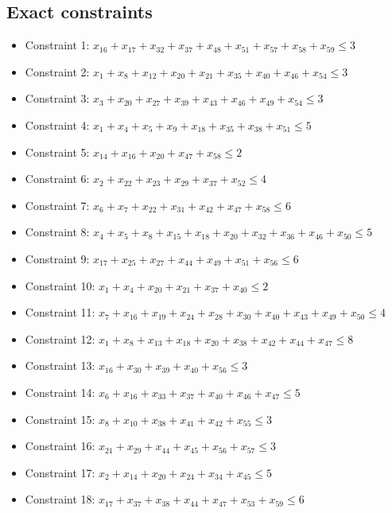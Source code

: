 \documentclass[11pt]{article}
\begin{document}
\subsection*{Exact constraints}
\begin{itemize}
\item Constraint 1: $x_{16} + x_{17} + x_{32} + x_{37} + x_{48} + x_{51} + x_{57} + x_{58} + x_{59} \le 3$
\item Constraint 2: $x_{1} + x_{8} + x_{12} + x_{20} + x_{21} + x_{35} + x_{40} + x_{46} + x_{54} \le 3$
\item Constraint 3: $x_{3} + x_{20} + x_{27} + x_{39} + x_{43} + x_{46} + x_{49} + x_{54} \le 3$
\item Constraint 4: $x_{1} + x_{4} + x_{5} + x_{9} + x_{18} + x_{35} + x_{38} + x_{51} \le 5$
\item Constraint 5: $x_{14} + x_{16} + x_{20} + x_{47} + x_{58} \le 2$
\item Constraint 6: $x_{2} + x_{22} + x_{23} + x_{29} + x_{37} + x_{52} \le 4$
\item Constraint 7: $x_{6} + x_{7} + x_{22} + x_{31} + x_{42} + x_{47} + x_{58} \le 6$
\item Constraint 8: $x_{4} + x_{5} + x_{8} + x_{15} + x_{18} + x_{20} + x_{32} + x_{36} + x_{46} + x_{50} \le 5$
\item Constraint 9: $x_{17} + x_{25} + x_{27} + x_{44} + x_{49} + x_{51} + x_{56} \le 6$
\item Constraint 10: $x_{1} + x_{4} + x_{20} + x_{21} + x_{37} + x_{40} \le 2$
\item Constraint 11: $x_{7} + x_{16} + x_{19} + x_{24} + x_{28} + x_{30} + x_{40} + x_{43} + x_{49} + x_{50} \le 4$
\item Constraint 12: $x_{1} + x_{8} + x_{13} + x_{18} + x_{20} + x_{38} + x_{42} + x_{44} + x_{47} \le 8$
\item Constraint 13: $x_{16} + x_{30} + x_{39} + x_{40} + x_{56} \le 3$
\item Constraint 14: $x_{6} + x_{16} + x_{33} + x_{37} + x_{40} + x_{46} + x_{47} \le 5$
\item Constraint 15: $x_{8} + x_{10} + x_{38} + x_{41} + x_{42} + x_{55} \le 3$
\item Constraint 16: $x_{21} + x_{29} + x_{44} + x_{45} + x_{56} + x_{57} \le 3$
\item Constraint 17: $x_{2} + x_{14} + x_{20} + x_{24} + x_{34} + x_{45} \le 5$
\item Constraint 18: $x_{17} + x_{37} + x_{38} + x_{44} + x_{47} + x_{53} + x_{59} \le 6$

\end{itemize}
\end{document}

